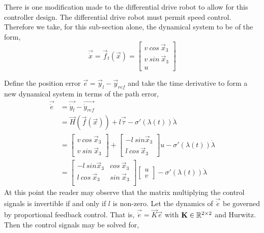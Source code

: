 \documentclass[oneside, 11pt]{book}
\begin{document}
There is one modification made to the differential drive robot to allow for this controller design. The differential drive robot must permit speed control. Therefore we take, for this sub-section alone, the dynamical system to be of the form,
\begin{equation}
    \vec{\dot{x}} = \vec{f}_t(\vec{x}) =
        \begin{bmatrix}
            v~cos~\vec{x}_3 \\
            v~sin~\vec{x}_3 \\
            u
        \end{bmatrix}
\end{equation}

Define the position error $\vec{e} = \vec{y}_l - \vec{y}_{ref}$ and take the time derivative to form a new dynamical system in terms of the path error,
\begin{align*}
    \vec{\dot{e}}   &= \vec{\dot{y}_l} - \vec{\dot{y}_{ref}}\\
                    &= \vec{H}(\vec{f}(\vec{x})) + l\vec{\dot{\tau}} - \sigma'(\lambda(t))\dot{\lambda}\\
                    &= \begin{bmatrix} v~cos~\vec{x}_3 \\ v~sin~\vec{x}_3 \end{bmatrix}
                        +
                        \begin{bmatrix} -l~sin\vec{x}_3 \\ l~cos~\vec{x}_3 \end{bmatrix} u
                        -
                        \sigma'(\lambda(t))\dot{\lambda}\\
                    &=  \begin{bmatrix}
                            -l~sin\vec{x}_3 & cos~\vec{x}_3 \\
                            l~cos~\vec{x}_3 & sin~\vec{x}_3 \\
                        \end{bmatrix}
                        \begin{bmatrix}
                            u \\ v
                        \end{bmatrix}
                        -
                        \sigma'(\lambda(t))\dot{\lambda}
\end{align*}
At this point the reader may observe that the matrix multiplying the control signals is invertible if and only if $l$ is non-zero. Let the dynamics of $\vec{\dot{e}}$ be governed by proportional feedback control. That is, $\vec{\dot{e}}=\vec{K}\vec{e}$ with $\mathbf{K}\in\mathbb{R}^{2\times2}$ and Hurwitz. Then the control signals may be solved for,
\end{document}
